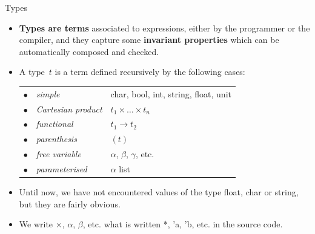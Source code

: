 %
\begin{frame}{Types}

  \begin{itemize}

    \item \textbf{Types are terms} associated to expressions, either
      by the programmer or the compiler, and they capture some
      \textbf{invariant properties} which can be automatically
      composed and checked.

    \item A type~$t$ is a term defined recursively by the following
      cases:\\
      \smallskip
      \begin{tabular}{r@{\,\,}ll}
        $\bullet$
        & \emph{simple}
        & \textsf{char}, \textsf{bool}, \textsf{int}, \textsf{string},
        \textsf{float}, \textsf{unit}\\
        $\bullet$
        & \emph{Cartesian product}
        & $t_1 \times \ldots \times t_n$\\
        $\bullet$
        & \emph{functional}
        & $t_1 \rightarrow t_2$\\
        $\bullet$
        & \emph{parenthesis}
        & $(t)$\\
        $\bullet$
        & \emph{free variable}
        & $\alpha$, $\beta$, $\gamma$, etc. \\
        $\bullet$
        & \emph{parameterised}
        & $\alpha$ \textsf{list}
      \end{tabular}

    \item Until now, we have not encountered values of the type
      \textsf{float}, \textsf{char} or \textsf{string}, but they are
      fairly obvious.

    \item We write $\times$, $\alpha$, $\beta$, etc. what is written
      \textsf{*}, \textsf{'a}, \textsf{'b}, etc. in the source code.

  \end{itemize}

\end{frame}

